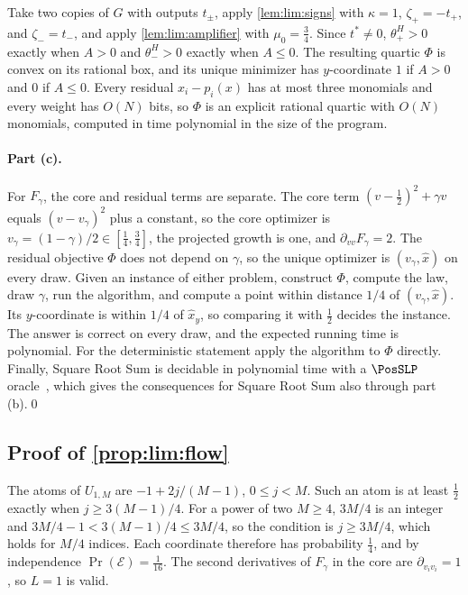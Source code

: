 Take two copies of $G$ with outputs $t_\pm$, apply \cref{lem:lim:signs} with
$\kappa=1$, $\zeta_+=-t_+$, and $\zeta_-=t_-$, and apply
\cref{lem:lim:amplifier} with $\mu_0=\frac34$. Since $t^*\ne0$,
$\theta_+^H>0$ exactly when $A>0$ and $\theta_-^H>0$ exactly when $A\le0$.
The resulting quartic $\Phi$ is convex on its rational box, and its unique
minimizer has $y$-coordinate $1$ if $A>0$ and $0$ if $A\le0$. Every residual
$x_i-p_i(x)$ has at most three monomials and every weight has $O(N)$ bits,
so $\Phi$ is an explicit rational quartic with $O(N)$ monomials, computed in
time polynomial in the size of the program.

\paragraph{Part (c).}
For $F_\gamma$, the core and residual terms are separate. The core term
$(v-\frac12)^2+\gamma v$ equals $(v-v_\gamma)^2$ plus a constant, so the
core optimizer is $v_\gamma=(1-\gamma)/2\in[\frac14,\frac34]$, the projected
growth is one, and $\partial_{vv}F_\gamma=2$. The residual objective $\Phi$
does not depend on $\gamma$, so the unique optimizer is $(v_\gamma,\hat x)$
on every draw. Given an instance of either problem, construct $\Phi$,
compute the law, draw $\gamma$, run the algorithm, and compute a point within
distance $1/4$ of $(v_\gamma,\hat x)$. Its $y$-coordinate is within $1/4$ of
$\hat x_y$, so comparing it with $\frac12$ decides the instance. The answer
is correct on every draw, and the expected running time is polynomial. For
the deterministic statement apply the algorithm to $\Phi$ directly. Finally,
Square Root Sum is decidable in polynomial time with a $\PosSLP$
oracle~\citep{allender2009-on-the-complexity-of-numerical}, which gives the
consequences for Square Root Sum also through part (b).\qed

\subsection{Proof of \texorpdfstring{\cref{prop:lim:flow}}{the flow-boundary proposition}}\label{app:lim:flow}

The atoms of $U_{1,M}$ are $-1+2j/(M-1)$, $0\le j<M$. Such an atom is at
least $\frac12$ exactly when $j\ge3(M-1)/4$. For a power of two $M\ge4$,
$3M/4$ is an integer and $3M/4-1<3(M-1)/4\le3M/4$, so the condition is
$j\ge3M/4$, which holds for $M/4$ indices. Each coordinate therefore has
probability $\frac14$, and by independence $\Pr(\mathcal E)=\frac1{16}$. The
second derivatives of $F_\gamma$ in the core are $\partial_{v_iv_i}=1$, so
$L=1$ is valid.

